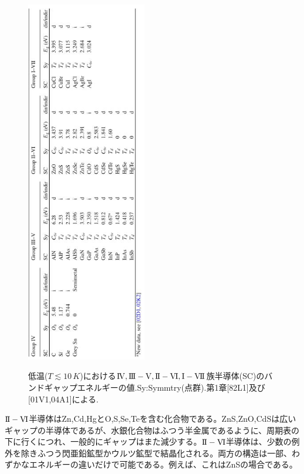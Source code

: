 \documentclass[11pt,a4j,uplatex]{jsarticle}
\begin{document}
\renewcommand{\figurename}{表}%
\setcounter{figure}{1}
\begin{figure}[htb]
  \centering
  \caption{低温($T\lesssim10\,K$)における$\mathrm{I\hspace{-1pt}V},\mathrm{I\hspace{-1pt}I\hspace{-1pt}I-V},\mathrm{I\hspace{-1pt}I-V\hspace{-1pt}I},\mathrm{I-V\hspace{-1pt}I\hspace{-1pt}I}$族半導体(SC)のバンドギャップエネルギーの値.Sy:Symmtry(点群).第1章[82L1]及び[01V1,04A1]による.}
  \includegraphics[clip,height=16cm]{8_2.JPG}
  \label{table8.2}
\end{figure}

$\mathrm{I\hspace{-1pt}I-V\hspace{-1pt}I}$半導体はZn,Cd,HgとO,S,Se,Teを含む化合物である。ZnS,ZnO,CdSは広いギャップの半導体であるが、水銀化合物はふつう半金属であるように、周期表の下に行くにつれ、一般的にギャップはまた減少する。$\mathrm{I\hspace{-1pt}I-V\hspace{-1pt}I}$半導体は、少数の例外を除きふつう閃亜鉛鉱型かウルツ鉱型で結晶化される。両方の構造は一部、わずかなエネルギーの違いだけで可能である。例えば、これはZnSの場合である。
\end{document}
